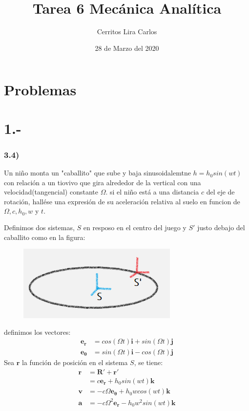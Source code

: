 \documentclass{article}
\title{Tarea 6 Mecánica Analítica}
\author{Cerritos Lira Carlos}
\date{28 de Marzo del 2020}
\begin{document}
\maketitle
\section*{Problemas}
\section*{1.-}
\subsubsection*{3.4)}
Un niño monta un "caballito" que sube y baja sinusoidalemtne $h=h_0sin(wt)$ con 
relación a un tiovivo que gira alrededor de la vertical con una velocidad(tangencial)
constante $\Omega$. si el niño está a una distancia $c$ del eje de rotación, 
hallése una expresión de su aceleración relativa al suelo en funcion de $\Omega, c, h_0, w$ 
y $t$. 
\begin{tcolorbox}[breakable]
    Definimos dos sistemas, $S$ en resposo en el centro del juego y $S'$ justo debajo del 
    caballito como en la figura:
    \begin{figure}[H]
        \centering
        \includegraphics[]{p1_horse.png}
    \end{figure}
    definimos los vectores:
    \begin{align*}
        \bm{e_r} &= cos(\Omega t) \bm{i} + sin(\Omega t) \bm{j} \\ 
        \bm{e_\theta} &= sin(\Omega t)\bm{i} - cos(\Omega t) \bm{j}
    \end{align*}
    Sea $\bm{r}$ la función de posición en el sistema $S$, se tiene:
    \begin{align*}
        \bm{r} 
        &= \bm{R'} + \bm{r'} \\
        &= c\bm{e_r} + h_0sin(wt)\bm{k} \\
        \bm{v} &= -c\Omega\bm{e_\theta} + h_0wcos(wt)\bm{k} \\
        \bm{a} &= -c\Omega^2\bm{e_r} - h_0w^2sin(wt)\bm{k} \\
    \end{align*}
\end{tcolorbox}
\end{document}
